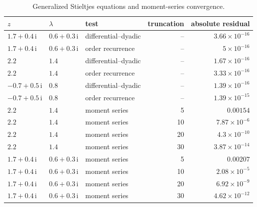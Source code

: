 \begin{table}[htbp]
\centering\small
\caption{Generalized Stieltjes equations and moment-series convergence.}
\label{p11:tab:stieltjes-checks}
\begin{tabular}{@{}lllrr@{}}
\toprule
$z$ & $\lambda$ & test & truncation & absolute residual\\
\midrule
$1.7+0.4\,\mathrm{i}$ & $0.6+0.3\,\mathrm{i}$ & differential--dyadic & -- & $3.66\mathbin{\times}10^{-16}$\\
$1.7+0.4\,\mathrm{i}$ & $0.6+0.3\,\mathrm{i}$ & order recurrence & -- & $5\mathbin{\times}10^{-16}$\\
$2.2$ & $1.4$ & differential--dyadic & -- & $1.67\mathbin{\times}10^{-16}$\\
$2.2$ & $1.4$ & order recurrence & -- & $3.33\mathbin{\times}10^{-16}$\\
$-0.7+0.5\,\mathrm{i}$ & $0.8$ & differential--dyadic & -- & $1.39\mathbin{\times}10^{-16}$\\
$-0.7+0.5\,\mathrm{i}$ & $0.8$ & order recurrence & -- & $1.39\mathbin{\times}10^{-15}$\\
$2.2$ & $1.4$ & moment series & 5 & $0.00154$\\
$2.2$ & $1.4$ & moment series & 10 & $7.87\mathbin{\times}10^{-6}$\\
$2.2$ & $1.4$ & moment series & 20 & $4.3\mathbin{\times}10^{-10}$\\
$2.2$ & $1.4$ & moment series & 30 & $3.87\mathbin{\times}10^{-14}$\\
$1.7+0.4\,\mathrm{i}$ & $0.6+0.3\,\mathrm{i}$ & moment series & 5 & $0.00207$\\
$1.7+0.4\,\mathrm{i}$ & $0.6+0.3\,\mathrm{i}$ & moment series & 10 & $2.08\mathbin{\times}10^{-5}$\\
$1.7+0.4\,\mathrm{i}$ & $0.6+0.3\,\mathrm{i}$ & moment series & 20 & $6.92\mathbin{\times}10^{-9}$\\
$1.7+0.4\,\mathrm{i}$ & $0.6+0.3\,\mathrm{i}$ & moment series & 30 & $4.62\mathbin{\times}10^{-12}$\\
\bottomrule
\end{tabular}
\end{table}


